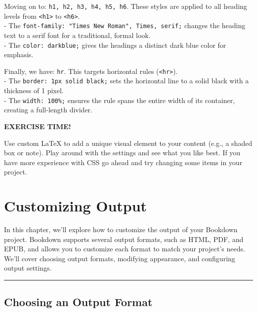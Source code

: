 \documentclass[
]{book}
\newenvironment{blackbox}{
  \definecolor{shadecolor}{rgb}{0, 0, 0}
  \color{white}
  \begin{shaded}
  }
 {\end{shaded}}
\theoremstyle{definition}
\theoremstyle{definition}
\theoremstyle{definition}
\theoremstyle{definition}
\theoremstyle{remark}
\begin{document}
Moving on to: \texttt{h1,\ h2,\ h3,\ h4,\ h5,\ h6}. These styles are applied to all heading levels from \texttt{\textless{}h1\textgreater{}} to \texttt{\textless{}h6\textgreater{}}.\\
- The \texttt{font-family:\ "Times\ New\ Roman",\ Times,\ serif;} changes the heading text to a serif font for a traditional, formal look.\\
- The \texttt{color:\ darkblue;} gives the headings a distinct dark blue color for emphasis.

Finally, we have: \texttt{hr}. This targets horizontal rules (\texttt{\textless{}hr\textgreater{}}).\\
- The \texttt{border:\ 1px\ solid\ black;} sets the horizontal line to a solid black with a thickness of 1 pixel.\\
- The \texttt{width:\ 100\%;} ensures the rule spans the entire width of its container, creating a full-length divider.

\begin{blackbox}

\begin{center}
\textbf{EXERCISE TIME!}

\end{center}

Use custom LaTeX to add a unique visual element to your content (e.g., a shaded box or note). Play around with the settings and see what you like best. If you have more experience with CSS go ahead and try changing some items in your project.

\end{blackbox}

\chapter{Customizing Output}\label{chapter7}

In this chapter, we'll explore how to customize the output of your Bookdown project. Bookdown supports several output formats, such as HTML, PDF, and EPUB, and allows you to customize each format to match your project's needs. We'll cover choosing output formats, modifying appearance, and configuring output settings.

\begin{center}\rule{0.5\linewidth}{0.5pt}\end{center}

\section{Choosing an Output Format}\label{choosing-an-output-format}
\end{document}
